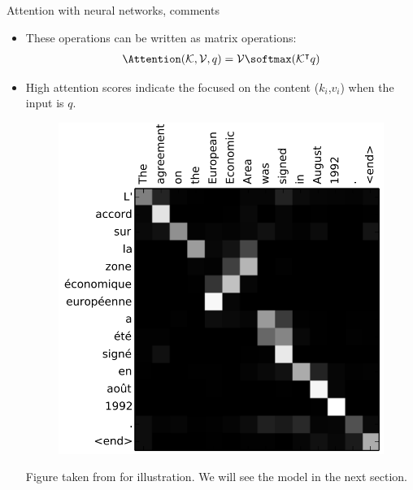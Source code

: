 \begin{frame}{Attention with neural networks, comments}
\begin{itemize}
\item These operations can be written as matrix operations:
      \begin{eqnarray*}
              \Attention(\mathcal{K},\mathcal{V}, q) = \mathcal{V} \softmax(\mathcal{K}^{\intercal}q)
      \end{eqnarray*}
\vspace{-3mm}
\pause
\item High attention scores indicate the  focused on the content ($k_i$,$v_i$) when the input is $q$.
\vspace{-3mm}
\begin{figure}
                        \centering
                        \includegraphics[width=0.4\linewidth]{./figures/bahdanau_att.png}
\end{figure}
{\scriptsize Figure taken from  for illustration.
We will see the model in the next section.}
\end{itemize}
\end{frame}

